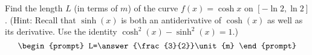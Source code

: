 \documentclass{ximera}
\author{Gregory Hartman \and Matthew Carr}
\begin{document}
\begin{exercise}





Find the length $L$ (in terms of $\unit{m}$) of the curve $f(x)=\cosh x$ on $[-\ln 2,\ln 2]$. (Hint: Recall that $\sinh(x)$ is both an antiderivative of $\cosh(x)$ as well as its derivative. Use the identity $\cosh^{2}(x)-\sinh^{2}(x)=1$.)
\[
\begin{prompt}
L=\answer{\frac{3}{2}}\unit{m}
\end{prompt}
\]




\end{exercise}
\end{document}
